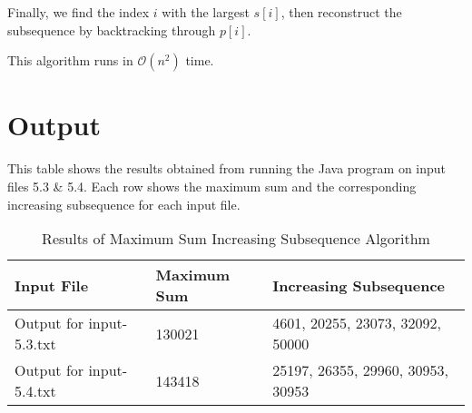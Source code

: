 \documentclass[11pt]{article}
\begin{document}
Finally, we find the index $i$ with the largest $s[i]$, then reconstruct the subsequence by backtracking through $p[i]$.

This algorithm runs in $\mathcal{O}(n^2)$ time.

\section*{Output}
This table shows the results obtained from running the Java program on input files 5.3 & 5.4. Each row shows the maximum sum and the corresponding increasing subsequence for each input file.

\begin{table}[h]
    \centering
    \begin{tabular}{llp{6cm}}
        \toprule
        \textbf{Input File} & \textbf{Maximum Sum} & \textbf{Increasing Subsequence} \\
        \midrule
        Output for input-5.3.txt & 130021 & 4601, 20255, 23073, 32092, 50000 \\
        Output for input-5.4.txt & 143418 & 25197, 26355, 29960, 30953, 30953 \\
        \bottomrule
    \end{tabular}
    \caption{Results of Maximum Sum Increasing Subsequence Algorithm}
    \label{tab:results}
\end{table}

\newpage
\end{document}
